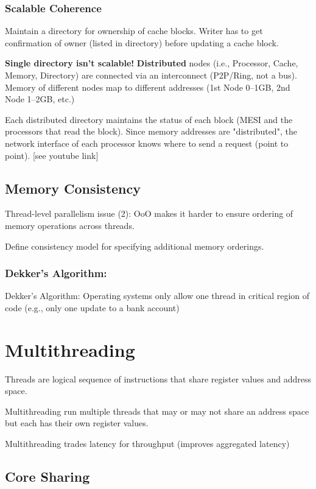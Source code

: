 \documentclass{article}
\begin{document}
\begin{multicols*}{2}
\subsubsection*{Scalable Coherence}
Maintain a directory for ownership of cache blocks. Writer has to get confirmation of owner (listed in directory) before updating a cache block.
\medskip\par\noindent
\textbf{Single directory isn't scalable!} \textbf{Distributed} nodes (i.e., Processor, Cache, Memory, Directory) are connected via an interconnect (P2P/Ring, not a bus). Memory of different nodes map to different addresses (1st Node 0--1GB, 2nd Node 1--2GB, etc.)
\medskip\par\noindent
Each distributed directory maintains the status of each block (MESI and the processors that read the block). Since memory addresses are "distributed", the network interface of each processor knows where to send a request (point to point). [see youtube link]

\subsection*{Memory Consistency}
Thread-level parallelism issue (2): OoO makes it harder to ensure ordering of memory operations across threads.
\medskip\par\noindent
Define consistency model for specifying additional memory orderings.
\subsubsection*{Dekker's Algorithm:}
Dekker's Algorithm: Operating systems only allow one thread in critical region of code (e.g., only one update to a bank account)

\section{Multithreading}
Threads are logical sequence of instructions that share register values and address space.
\medskip\par\noindent
Multithreading run multiple threads that may or may not share an address space but each has their own register values.
\medskip\par\noindent
Multithreading trades latency for throughput (improves aggregated latency)

\subsection*{Core Sharing}

\end{multicols*}
\end{document}
